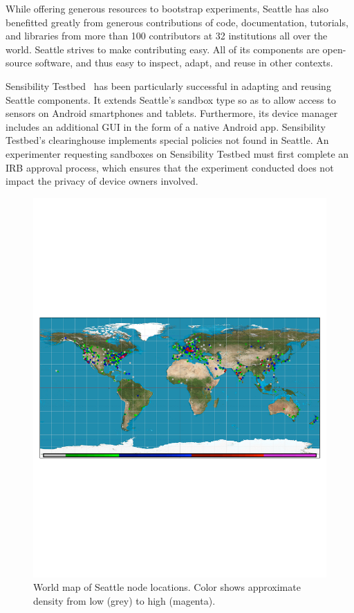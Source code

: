 While offering generous resources to bootstrap experiments,
Seattle has also benefitted greatly from generous contributions
of code, documentation, tutorials, and libraries from more than 100
contributors at 32 institutions all over the world.
Seattle strives to make contributing easy. All of its components
are open-source software, and thus easy to inspect, adapt, and
reuse in other contexts.

Sensibility Testbed~\cite{zhuang2014sensibility} has been particularly
successful in adapting and reusing Seattle components. It extends
Seattle's sandbox type so as to allow access
to sensors on Android smartphones and tablets. Furthermore, its
device manager includes an additional \gls{GUI} in the form of
a native Android app. Sensibility Testbed's clearinghouse implements
special policies not found in Seattle. An experimenter requesting
sandboxes on Sensibility Testbed must first complete
an \gls{IRB} approval process, which ensures that the experiment conducted
does not impact the privacy of device owners involved.


\begin{figure}
  \centering
  \includegraphics[width=\columnwidth]{figures/finishedmap_ipinfo_small.pdf}
  \caption{World map of Seattle node locations. Color shows approximate density from low (grey) to high (magenta).}
  \label{fig:map}
\end{figure}
